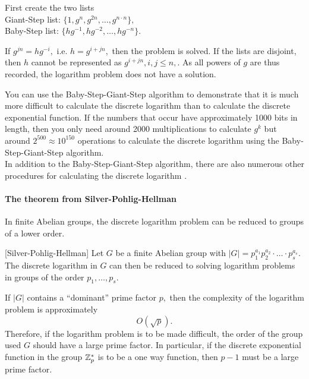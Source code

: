 \begin{Proof}{}
  First create the two lists \\
Giant-Step list: $ \{1,g^n,g^{2n}, \ldots, g^{n \cdot n}\}, $\\
Baby-Step list: $ \{ hg^{-1} , hg^{-2} , \ldots , hg^{-n} \}. $ \par
If $ g^{jn} = hg^{-i}, $ i.e. $ h = g^{i+jn}, $ then the problem is solved. If 
the lists are disjoint, then $ h $ cannot be represented as $ g^{i + jn}, i, 
j\leq n,$. As all powers of $ g $ are thus recorded, the logarithm problem does 
not have a solution.
\end{Proof}

You can use the Baby-Step-Giant-Step algorithm to demonstrate that it is much 
more difficult to calculate the discrete logarithm than to calculate the 
discrete exponential function. If the numbers that occur have approximately 1000 
bits in length, then you only need around 2000 multiplications to calculate $ 
g^k $ but around $ 2^{500} \approx 10^{150} $ operations to calculate the 
discrete logarithm using the Baby-Step-Giant-Step algorithm. \\
In addition to the Baby-Step-Giant-Step algorithm, there are also numerous other 
procedures for calculating the discrete logarithm \cite{4Stinson1995}.

\paragraph{The theorem from Silver-Pohlig-Hellman}
In finite Abelian groups, the discrete logarithm problem can be reduced to 
groups of a lower order.
\begin{theorem}\label{thm-cry-pohe}[Silver-Pohlig-Hellman]
Let $ G $ be a finite Abelian group with $ |G|= p_1^{a_1} p_2^{a_2} \cdot \ldots 
\cdot p_s^{a_s}. $ The discrete logarithm in $ G $ can then be reduced to 
solving logarithm problems in groups of the order $ p_1, \ldots , p_s $.
\end{theorem}

If $ |G| $ contains a ``dominant'' prime factor $ p ,$ then the 
complexity  of the logarithm problem is approximately
\[ O(\sqrt{p}). \]
Therefore, if the logarithm problem is to be made difficult, the order of the 
group used $ G $ should have a large prime factor. In particular, if the 
discrete exponential function in the group $ \mathbf{\mathbb{Z}}_p^{\ast} $ is to be a one way 
function, then $ p -1 $ must be a large prime factor.




